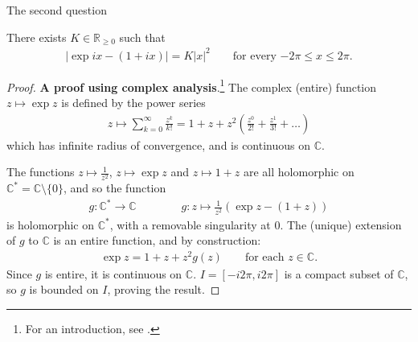 \documentclass[main.tex]{subfiles}
\begin{document}
The second question  


\begin{lemma}\label{lem:expaprrox}
There exists $K \in \mathbb{R}_{\geq 0}$ such that
\begin{align*}
    |\exp ix - (1 + ix)| = K |x|^2 \qquad \text{for every $-2\pi \leq x \leq 2\pi$}.
\end{align*}
\end{lemma}

\begin{proof}
\textbf{A proof using complex analysis}.\footnote{For an introduction, see \cite{GarlingVolIII}.} The complex (entire) function $z \mapsto \exp z$ is defined by the power series
\begin{align*}
    z\mapsto \sum_{k=0}^{\infty} \frac{z^k}{k!} = 1 + z + z^2\left(\frac{z^0}{2!}+\frac{z^1}{3!}+\dots\right)
\end{align*}
which has infinite radius of convergence, and is continuous on $\mathbb{C}$.

The functions $z \mapsto \frac{1}{z^2}$, $z \mapsto \exp z$ and $z \mapsto 1+z$ are all holomorphic on $\mathbb{C}^*=\mathbb{C} \setminus \{0\}$, and so the function
\begin{align}
    g: \mathbb{C}^* \rightarrow \mathbb{C} \qquad \qquad
    g: z \mapsto \frac{1}{z^2}(\exp z - (1+z))
\end{align}
is holomorphic on $\mathbb{C}^*$, with a removable singularity at $0$. The (unique) extension of $g$ to $\mathbb{C}$ is an entire function, and by construction:
\begin{align*}
    \exp z = 1 + z + z^2g(z)\qquad \text{for each $z \in \mathbb{C}$}.
\end{align*}
Since $g$ is entire, it is continuous on $\mathbb{C}$.
$I=[-i2\pi, i2\pi]$ is a compact subset of $\mathbb{C}$, so $g$ is bounded on $I$, proving the result.
\end{proof}
\end{document}

